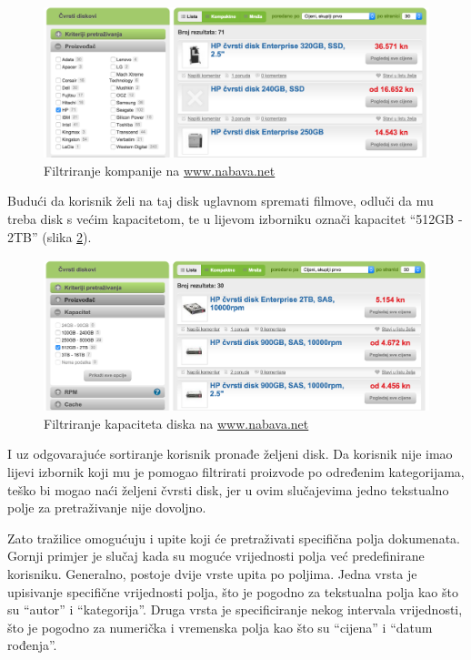 \documentclass[a4paper,twoside,12pt]{scrreprt}
\begin{document}
\begin{figure}[H]
  \centering
  \includegraphics[width=\textwidth]{nabava2}
  \caption{Filtriranje kompanije na \url{www.nabava.net}}
  \label{nabava2}
\end{figure}

Budući da korisnik želi na taj disk uglavnom spremati filmove, odluči da mu treba disk s većim kapacitetom, te u lijevom izborniku označi kapacitet ``512GB - 2TB'' (slika \ref{nabava3}).

\begin{figure}[H]
  \centering
  \includegraphics[width=\textwidth]{nabava3}
  \caption{Filtriranje kapaciteta diska na \url{www.nabava.net}}
  \label{nabava3}
\end{figure}

I uz odgovarajuće sortiranje korisnik pronađe željeni disk. Da korisnik nije imao lijevi izbornik koji mu je pomogao filtrirati proizvode po određenim kategorijama, teško bi mogao naći željeni čvrsti disk, jer u ovim slučajevima jedno tekstualno polje za pretraživanje nije dovoljno.

Zato tražilice omogućuju i upite koji će pretraživati specifična polja dokumenata. Gornji primjer je slučaj kada su moguće vrijednosti polja već predefinirane korisniku. Generalno, postoje dvije vrste upita po poljima. Jedna vrsta je upisivanje specifične vrijednosti polja, što je pogodno za tekstualna polja kao što su ``autor'' i ``kategorija''. Druga vrsta je specificiranje nekog intervala vrijednosti, što je pogodno za numerička i vremenska polja kao što su ``cijena'' i ``datum rođenja''.
\end{document}
